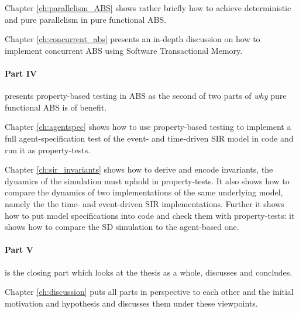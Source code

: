 Chapter \ref{ch:parallelism_ABS} shows rather briefly how to achieve deterministic and pure parallelism in pure functional ABS. 

\medskip

Chapter \ref{ch:concurrent_abs} presents an in-depth discussion on how to implement concurrent ABS using Software Transactional Memory.

\medskip

\paragraph{Part IV} presents property-based testing in ABS as the second of two parts of \textit{why} pure functional ABS is of benefit.
\medskip

Chapter \ref{ch:agentspec} shows how to use property-based testing to implement a full agent-specification test of the event- and time-driven SIR model in code and run it as property-tests.

\medskip

Chapter \ref{ch:sir_invariants} shows how to derive and encode invariants, the dynamics of the simulation must uphold in property-tests. It also shows how to compare the dynamics of two implementations of the same underlying model, namely the the time- and event-driven SIR implementations. Further it shows how to put model specifications into code and check them with property-tests: it shows how to compare the SD simulation to the agent-based one.

\medskip

\paragraph{Part V} is the closing part which looks at the thesis as a whole, discusses and concludes.
\medskip



Chapter \ref{ch:discussion} puts all parts in perspective to each other and the initial motivation and hypothesis and discusses them under these viewpoints.

